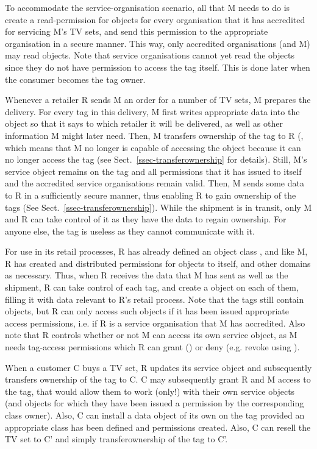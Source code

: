 To accommodate the service-organisation scenario, all that M needs to do is
create a read-permission for  objects for every organisation
that it has accredited for servicing M's TV sets, and send this permission to
the appropriate organisation in a secure manner. This way, only accredited
organisations (and M) may read  objects.
Note that service organisations cannot yet read the
 objects since they do not have permission to access the tag
itself. This is done later when the consumer becomes the tag owner.

Whenever a retailer R sends M an order for a number of TV sets, M prepares the
delivery. For every tag in this delivery, M first writes appropriate data into
the  object so that it says to which retailer it will be delivered, as
well as other information M might later need. Then, M transfers ownership of
the tag to R (, which means that M no longer is
capable of accessing the  object because it can no longer access the tag
(see Sect.~\ref{ssec-transferownership} for details). Still, M's service
object remains on the tag and all permissions that it has issued to itself and
the accredited service organisations remain valid. 
Then, M sends some data to R in a sufficiently secure manner, thus enabling R 
to gain ownership of the tags (See Sect.~\ref{ssec-transferownership}). 
While the shipment is in transit, only M and R can take control of it as they
have the data to regain ownership. For anyone else, the tag is useless as they
cannot communicate with it. 

For use in its retail processes, R has already defined an object class ,
and like M, R has created and distributed permissions for 
objects to itself, and other domains as necessary. 
Thus, when R receives the data that M has sent as well as the shipment, 
R can take control of each tag, and create a  object on each 
of them, filling it with data relevant to R's retail process. 
Note that the tags still contain  objects, but R can only 
access such objects if it has been issued appropriate access permissions, i.e. if 
R is a service organisation that M has accredited.
Also note that R controls whether or not M can access its own service object, 
as M needs tag-access permissions which R can grant () or 
deny (e.g. revoke using ).

When a customer C buys a TV set, R updates its service object and subsequently
transfers ownership of the tag to C. C may subsequently grant R and M access to
the tag, that would allow them to work (only!) with their own service
objects (and objects for which they have been issued a permission by the corresponding 
class owner). Also, C can install a data object of its own on the tag provided an
appropriate class has been defined and permissions created. Also, C can resell
the TV set to C' and simply transferownership of the tag to C'. 

